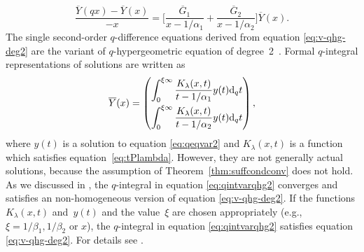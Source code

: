 \documentclass[pdftex]{sigma}
\numberwithin{equation}{section}
\theoremstyle{definition}
\begin{document}
\begin{equation} \label{eq:v-qhg-deg2}
 \frac{\overline{Y}(qx) - \overline{Y}(x)}{-x}
 = \Biggl[ \frac{\overline{G}_1}{x-1/\alpha _1} +\frac{\overline{G}_2}{x-1/\alpha _2} \Biggr] \overline{Y}(x).
%
\end{equation}
The single second-order $q$-difference equations derived from equation \eqref{eq:v-qhg-deg2} are the variant of $q$-hypergeometric equation of degree~2~\cite{HMST}.
Formal $q$-integral representations of solutions are written as
\begin{equation} \label{eq:qintvarqhg2}
\overline{Y}(x)
= \begin{pmatrix}
 \displaystyle \int_0^{\xi \infty} \frac{K_{\lambda}(x,t)}{t-1/\alpha_1} y(t) {\rm d}_q t \vspace{1mm}\\
 \displaystyle \int_0^{\xi \infty} \frac{K_{\lambda}(x,t)}{t-1/\alpha_2} y(t) {\rm d}_q t
 \end{pmatrix},
\end{equation}
where $y(t)$ is a solution to equation \eqref{eq:qeqvar2} and $K_{\lambda }(x,t)$ is a function which satisfies equation~\eqref{eq:tPlambda}.
However, they are not generally actual solutions, because the assumption of Theorem~\ref{thm:suffcondconv} does not hold.
As we discussed in \cite{AT}, the $q$-integral in equation \eqref{eq:qintvarqhg2} converges and satisfies an non-homogeneous version of equation \eqref{eq:v-qhg-deg2}.
If the functions $K_{\lambda}(x,t)$ and~$y(t)$ and the value~$\xi $ are chosen appropriately (e.g., $\xi =1/\beta_1, 1/\beta _2 $ or $x$), the $q$-integral in equation \eqref{eq:qintvarqhg2} satisfies equation \eqref{eq:v-qhg-deg2}.
For details see \cite[Section~4.1.1]{AT}.
\end{document}
